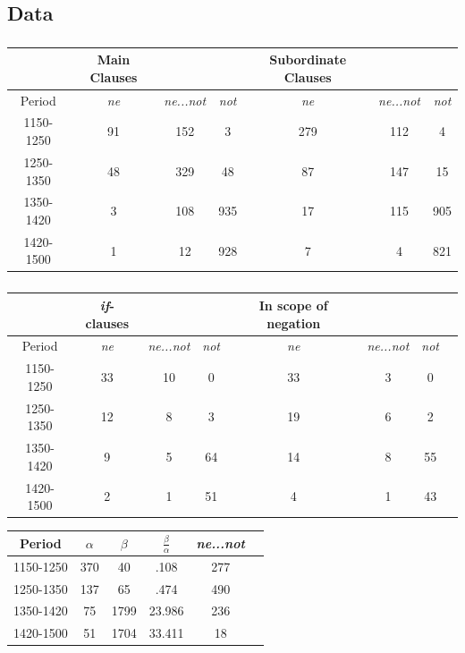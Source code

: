 \documentclass[compress]{beamer}
\begin{document}
\subsection{Data}

\begin{frame}
\frametitle{\cite{wallage2008}}
    \begin{center}
\footnotesize{
\begin{tabular}{@{}ccccccc@{}}
\hline
 & Main Clauses & & &Subordinate Clauses &  &\\
\hline
Period & \emph{ne} & \emph{ne...not} & \emph{not} & \emph{ne} & \emph{ne...not} & \emph{not}\\
\hline
1150-1250 & 91 & 152 & 3  & 279 & 112 & 4  \\
1250-1350 & 48 & 329 & 48 & 87 & 147 & 15  \\
1350-1420 & 3 & 108 & 935 & 17 & 115 & 905  \\
1420-1500 & 1 & 12 & 928  & 7 & 4 & 821  \\
\hline
\end{tabular}
}
\end{center}
\end{frame}

\begin{frame}
\frametitle{\cite{wallage2008}}
\begin{center}
\footnotesize{
\begin{tabular}{@{}cccccccc@{}}
\hline
& \emph{if}-clauses  & & &In scope of negation &    &\\
\hline
Period & \emph{ne} & \emph{ne...not} & \emph{not} & \emph{ne} & \emph{ne...not} & \emph{not}\\
\hline
1150-1250 & 33 & 10 & 0  & 33 & 3 & 0  \\
1250-1350 & 12 & 8 & 3  & 19 & 6 & 2  \\
1350-1420 & 9 & 5 & 64  & 14 & 8 & 55  \\
1420-1500 & 2 & 1 & 51  & 4 & 1 & 43  \\
\hline
\end{tabular}
}
\end{center}
\end{frame}

\begin{frame}{\cite{wallage2008}}
\begin{center}
\begin{tabular}{@{}cccccc@{}}
\hline
Period & $\alpha$ & $\beta$ & $\frac{\beta}{\alpha}$ & \emph{ne...not}\\
\hline
1150-1250 & 370 & 40  & .108 & 277\\
1250-1350 & 137 & 65 & .474 & 490\\
1350-1420 & 75 & 1799 & 23.986 & 236\\
1420-1500 & 51 & 1704 & 33.411 & 18\\
\hline
\end{tabular}
\end{center} 
\end{frame}
\end{document}
